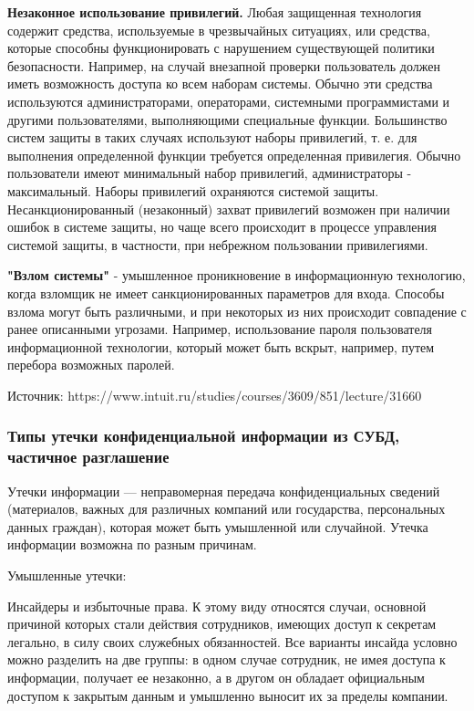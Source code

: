 \textbf{Незаконное использование привилегий.} Любая защищенная технология содержит
средства, используемые в чрезвычайных ситуациях, или средства, которые способны
функционировать с нарушением существующей политики безопасности. Например, на случай
внезапной проверки пользователь должен иметь возможность доступа ко всем наборам
системы. Обычно эти средства используются администраторами, операторами, системными
программистами и другими пользователями, выполняющими специальные функции.
Большинство систем защиты в таких случаях используют наборы привилегий, т. е. для
выполнения определенной функции требуется определенная привилегия. Обычно
пользователи имеют минимальный набор привилегий, администраторы - максимальный.
Наборы привилегий охраняются системой защиты. Несанкционированный (незаконный)
захват привилегий возможен при наличии ошибок в системе защиты, но чаще всего
происходит в процессе управления системой защиты, в частности, при небрежном
пользовании привилегиями.

\textbf{"Взлом системы"} - умышленное проникновение в информационную технологию, когда взломщик не имеет санкционированных параметров для входа. Способы взлома могут быть различными, и при некоторых из них происходит совпадение с ранее описанными угрозами. Например, использование пароля пользователя информационной технологии, который может быть вскрыт, например, путем перебора возможных паролей.

Источник: https://www.intuit.ru/studies/courses/3609/851/lecture/31660


\subsubsection{Типы утечки конфиденциальной информации из СУБД, частичное разглашение}

Утечки информации — неправомерная передача конфиденциальных сведений (материалов, важных для различных компаний или государства, персональных данных граждан), которая может быть умышленной или случайной. Утечка информации возможна по разным причинам.

Умышленные утечки:

Инсайдеры и избыточные права. К этому виду относятся случаи, основной причиной которых стали действия сотрудников, имеющих доступ к секретам легально, в силу своих служебных обязанностей. Все варианты инсайда условно можно разделить на две группы: в одном случае сотрудник, не имея доступа к информации, получает ее незаконно, а в другом он обладает официальным доступом к закрытым данным и умышленно выносит их за пределы компании.

